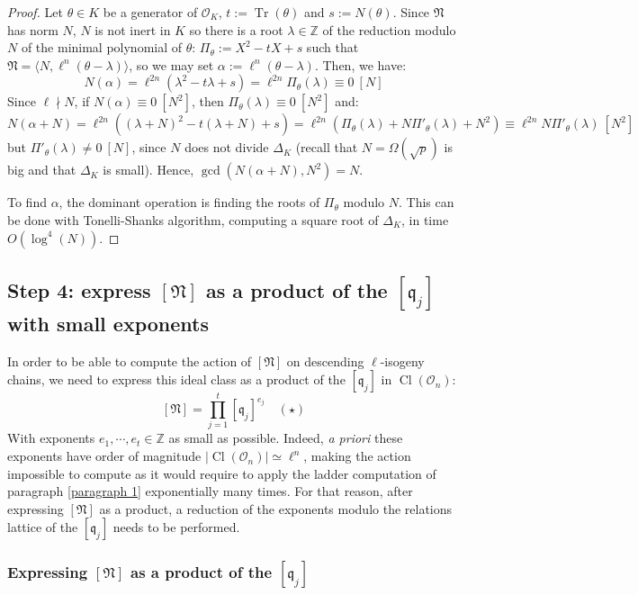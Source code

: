 \documentclass[a4paper,10pt]{report}
\theoremstyle{definition}
\theoremstyle{plain}
\theoremstyle{definition}
\newcommand{\Z}{\mathbb{Z}}
\newcommand{\mO}{\mathcal{O}}
\renewcommand{\(}{\left(}
\renewcommand{\)}{\right)}
\newcommand{\mf}[1]{\mathfrak{#1}}
\DeclareMathOperator{\Tr}{Tr}
\DeclareMathOperator{\Cl}{Cl}
\begin{document}
\begin{proof}
Let $\theta\in K$ be a generator of $\mO_K$, $t:=\Tr(\theta)$ and $s:=N(\theta)$. Since $\mf{N}$ has norm $N$, $N$ is not inert in $K$ so there is a root $\lambda\in\Z$ of the reduction modulo $N$ of the minimal polynomial of $\theta$: $\Pi_\theta:=X^2-tX+s$ such that $\mf{N}=\langle N,\ell^n(\theta-\lambda)\rangle$, so we may set $\alpha:=\ell^n(\theta-\lambda)$. Then, we have:
\[N(\alpha)=\ell^{2n}(\lambda^2-t\lambda+s)=\ell^{2n}\Pi_\theta(\lambda)\equiv 0 \ [N]\]
Since $\ell\nmid N$, if $N(\alpha)\equiv 0 \ [N^2]$, then $\Pi_\theta(\lambda)\equiv 0 \ [N^2]$ and:
\[N(\alpha+N)=\ell^{2n}((\lambda+N)^2-t(\lambda+N)+s)=\ell^{2n}(\Pi_\theta(\lambda)+N\Pi'_\theta(\lambda)+N^2)\equiv \ell^{2n}N\Pi'_\theta(\lambda) \ [N^2]\]
but $\Pi'_\theta(\lambda)\neq 0 \ [N]$, since $N$ does not divide $\Delta_K$ (recall that $N=\Omega(\sqrt{p})$ is big and that $\Delta_K$ is small). Hence, $\gcd(N(\alpha+N),N^2)=N$.  

To find $\alpha$, the dominant operation is finding the roots of $\Pi_\theta$ modulo $N$.  This can be done with Tonelli-Shanks \cite[algorithm 1.5.1]{Cohen1} algorithm, computing a square root of $\Delta_K$, in time $O(\log^4(N))$.
\end{proof}

\subsection{Step 4: express $[\mf{N}]$ as a product of the $[\mf{q}_j]$ with small exponents}\label{paragraph 11}

In order to be able to compute the action of $[\mf{N}]$ on descending $\ell$-isogeny chains, we need to express this ideal class as a product of the $[\mf{q}_j]$ in $\Cl(\mO_n)$:
\[[\mf{N}]=\prod_{j=1}^t[\mf{q}_j]^{e_j}\quad (\star)\]
With exponents $e_1, \cdots, e_{t}\in\Z$ as small as possible. Indeed, \emph{a priori} these exponents have order of magnitude $|\Cl(\mO_n)|\simeq\ell^n$, making the action impossible to compute as it would require to apply the ladder computation of paragraph \ref{paragraph 1} exponentially many times. For that reason, after expressing $[\mf{N}]$ as a product, a reduction of the exponents modulo the relations lattice of the $[\mf{q}_j]$ needs to be performed.

\subsubsection{Expressing $[\mf{N}]$ as a product of the $[\mf{q}_j]$}
\end{document}

